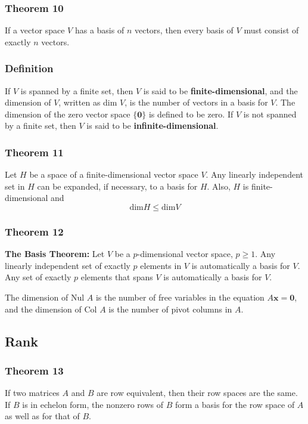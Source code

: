 \documentclass[letterpaper,11pt]{article}
\begin{document}
			\subsubsection{Theorem 10}
				If a vector space $V$ has a basis of $n$ vectors, then every basis of $V$ must consist of exactly $n$ vectors.
			\subsubsection{Definition}
				If $V$ is spanned by a finite set, then $V$ is said to be \textbf{finite-dimensional}, and the dimension of $V$, written as dim $V$, is the number of vectors in a basis for $V$. The dimension of the zero vector space $\{\mathbf{0}\}$ is defined to be zero. If $V$ is not spanned by a finite set, then $V$ is said to be \textbf{infinite-dimensional}.
			\subsubsection{Theorem 11}
				Let $H$ be a space of a finite-dimensional vector space $V$. Any linearly independent set in $H$ can be expanded, if necessary, to a basis for $H$. Also, $H$ is finite-dimensional and
				\begin{equation}
					\textrm{dim} H\leq\textrm{dim} V
				\end{equation}
			\subsubsection{Theorem 12}
				\textbf{The Basis Theorem:} Let $V$ be a $p$-dimensional vector space, $p\geq 1$. Any linearly independent set of exactly $p$ elements in $V$ is automatically a basis for $V$. Any set of exactly $p$ elements that spans $V$ is automatically a basis for $V$.
				
				The dimension of Nul $A$ is the number of free variables in the equation $A\mathbf{x}=\mathbf{0}$, and the dimension of Col $A$ is the number of pivot columns in $A$.
		\subsection{Rank}
			\subsubsection{Theorem 13}
				If two matrices $A$ and $B$ are row equivalent, then their row spaces are the same. If $B$ is in echelon form, the nonzero rows of $B$ form a basis for the row space of $A$ as well as for that of $B$.
\end{document}
